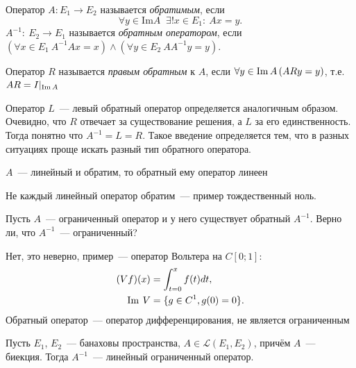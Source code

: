 \begin{definition}
    Оператор $A\!: E_1 \to E_2$ называется \textit{обратимым}, если
    \[\forall y \in \text{Im}A \;\; \exists!x \in E_1:\: Ax=y.\]
    $A^{-1}\!:\: E_2 \to E_1$ называется \textit{обратным оператором}, если $\left(\forall x \in E_1\: A^{-1}Ax=x \right) \wedge \left(\forall y \in E_2\: AA^{-1}y=y\right)$.
\end{definition}

\begin{definition}
    Оператор $R$ называется \textit{правым обратным} к $A$, если $\forall y \in \operatorname{Im} A \left(ARy=y \right)$, т.е. $AR=I|_{\operatorname{Im} A}$

    Оператор $L$~--- левый обратный оператор определяется аналогичным образом. 
    Очевидно, что $R$ отвечает за существование решения, а $L$ за его единственность.
    Тогда понятно что $A^{-1} = L = R$. Такое введение определяется тем, что в разных ситуациях проще искать разный тип обратного оператора.
\end{definition}

\begin{unnecessary}
    \begin{exercise}
        $A$~--- линейный и обратим, то обратный ему оператор линеен
    \end{exercise}

    \begin{example}
        Не каждый линейный оператор обратим~--- пример тождественный ноль.
    \end{example}
    
    \begin{exercise}
    Пусть $A$~--- ограниченный оператор и у него существует обратный $A^{-1}$. Верно ли, что $A^{-1}$~--- ограниченный?
    \end{exercise}
    \begin{answer}
    Нет, это неверно, пример~--- оператор Вольтера на $C[0;1]$:
    \begin{align*}
        (Vf)(x) &=\int_{t=0}^x f(t)dt,\\
        \operatorname{Im} \: V &= \{ g \in C^1, g(0)=0 \}.
    \end{align*}
    Обратный оператор~--- оператор дифференцирования, не является ограниченным
    \end{answer}
\end{unnecessary}

\begin{theorem}\label{theorem8.4_pre}\label{theorem8.4}
    Пусть $E_1$, $E_2$~--- банаховы пространства, $A \in \mathcal{L}(E_1, E_2)$, причём $A$~--- биекция. Тогда $A^{-1}$~--- линейный ограниченный оператор.
\end{theorem}

